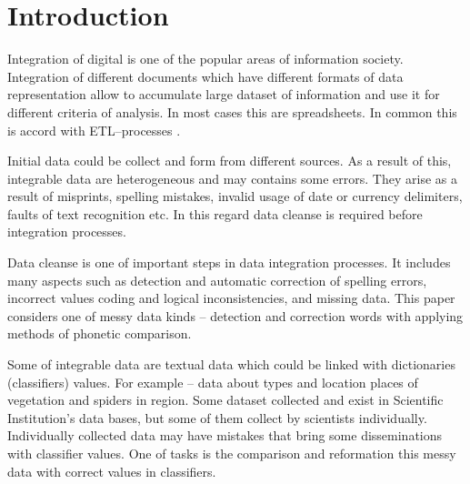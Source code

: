 \documentclass[conference,a4paper]{IEEEtran}
\begin{document}





%
\IEEEpeerreviewmaketitle



\section{Introduction}
Integration of digital is one of the popular areas of information society.  Integration of different documents which have different formats of data representation allow to accumulate large dataset of information and use it for different criteria of analysis. In most cases this are spreadsheets. In common this is accord with ETL--processes \cite{Storeya-2017}.

Initial data could be collect and form from different sources. As a result of this, integrable data are heterogeneous and may contains some errors. They arise as a result of misprints, spelling mistakes, invalid usage of date or currency delimiters, faults of text recognition etc. In this regard data cleanse is required before integration processes.

Data cleanse is one of important steps in data integration processes. It includes many aspects such as detection and automatic correction of spelling errors, incorrect values coding and logical inconsistencies, and missing data. This paper considers one of messy data kinds -- detection and correction words with applying methods of phonetic comparison. 

Some of integrable data are textual data which could be linked with dictionaries (classifiers) values. For example  -- data about types and location places of vegetation and spiders in region. Some dataset collected and exist in Scientific Institution's data bases, but some of them collect by scientists individually. Individually collected data may have mistakes that bring some disseminations with classifier values. One of tasks is the comparison and reformation this messy data with correct values in classifiers.
\end{document}
